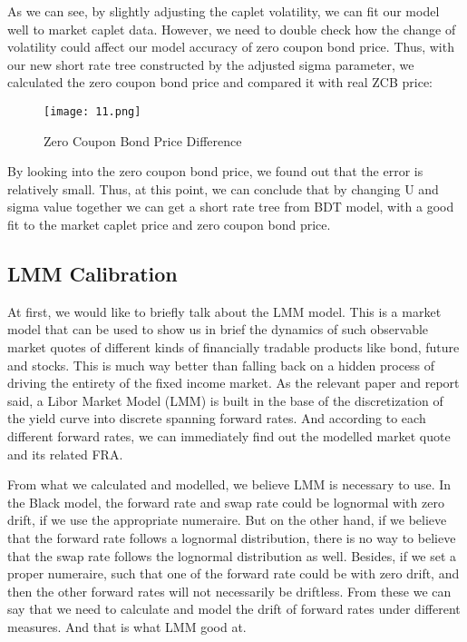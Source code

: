 \documentclass[paper = letterpaper, fontsize=12pt]{article}
\begin{document}
As we can see, by slightly adjusting the caplet volatility, we can fit our model well to market caplet data. However, we need to double check how the change of volatility could affect our model accuracy of zero coupon bond price. Thus, with our new short rate tree constructed by the adjusted sigma parameter, we calculated the zero coupon bond price and compared it with real ZCB price:

\begin{figure}[H]
    \centering
    \texttt{[image: 11.png]}
    \caption{Zero Coupon Bond Price Difference}
\end{figure}
 
By looking into the zero coupon bond price, we found out that the error is relatively small. Thus, at this point, we can conclude that by changing U and sigma value together we can get a short rate tree from BDT model, with a good fit to the market caplet price and zero coupon bond price.

\subsection{LMM Calibration}
At first, we would like to briefly talk about the LMM model. This is a market model that can be used to show us in brief the dynamics of such observable market quotes of different kinds of financially tradable products like bond, future and stocks. This is much way better than falling back on a hidden process of driving the entirety of the fixed income market. As the relevant paper and report said, a Libor Market Model (LMM) is built in the base of the discretization of the yield curve into discrete spanning forward rates. And according to each different forward rates, we can immediately find out the modelled market quote and its related FRA.

From what we calculated and modelled, we believe LMM is necessary to use. In the Black model, the forward rate and swap rate could be lognormal with zero drift, if we use the appropriate numeraire. But on the other hand, if we believe that the forward rate follows a lognormal distribution, there is no way to believe that the swap rate follows the lognormal distribution as well. Besides, if we set a proper numeraire, such that one of the forward rate could be with zero drift, and then the other forward rates will not necessarily be driftless. From these we can say that we need to calculate and model the drift of forward rates under different measures. And that is what LMM good at.
\end{document}
